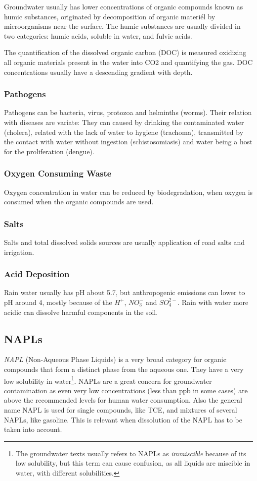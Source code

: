 \documentclass[11pt,twoside]{report}
\begin{document}
Groundwater usually has lower concentrations of organic compounds known as humic substances, originated by decomposition of organic materiél by microorganisms near the surface. The humic substances are usually divided in two categories: humic acids, soluble in water, and fulvic acids. 

The quantification of the dissolved organic carbon (DOC) is measured oxidizing all organic materials present in the water into CO2 and quantifying the gas. DOC concentrations usually have a descending gradient with depth. 

\subsubsection{Pathogens}
Pathogens can be bacteria, virus, protozoa and helminths (worms). Their relation with diseases are variate: They can caused by drinking the contaminated water (cholera), related with the lack of water to hygiene (trachoma), transmitted by the contact with water without ingestion (schistosomiasis) and water being a host for the proliferation (dengue).

\subsubsection{Oxygen Consuming Waste}
Oxygen concentration in water can be reduced by biodegradation, when oxygen is consumed when the organic compounds are used. 

\subsubsection{Salts}
Salts and total dissolved solids sources are usually application of road salts and irrigation.

\subsubsection{Acid Deposition}
Rain water usually has pH about 5.7, but anthropogenic emissions can lower to pH around 4, mostly because of the $H^{+}$, $NO_{3}^{-}$ and $SO_{4}^{2-}$. Rain with water more acidic can dissolve harmful components in the soil.

\subsection{NAPLs}
\textit{NAPL} (Non-Aqueous Phase Liquids) is a very broad category for organic compounds that form a distinct phase from the aqueous one. They have a very low solubility in water\footnote{The groundwater texts usually refers to NAPLs as \textit{immiscible} because of its low solubility, but this term can cause confusion, as all liquids are miscible in water, with different solubilities.}. NAPLs are a great concern for groundwater contamination as even very low concentrations (less than ppb in some cases) are above the recommended levels for human water consumption. Also the general name NAPL is used for single compounds, like TCE, and mixtures of several NAPLs, like gasoline. This is relevant when dissolution of the NAPL has to be taken into account. 
\end{document}
